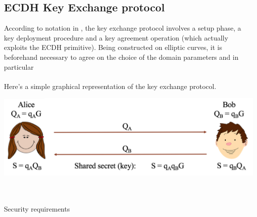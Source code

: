 \subsection{ECDH Key Exchange protocol}
According to notation in \cite{Sec}, the key exchange protocol involves a setup phase, a key deployment procedure and a key agreement operation (which actually exploits the ECDH primitive). 
Being constructed on elliptic curves, it is beforehand necessary to agree on the choice of the domain parameters and in particular
\\ \ \\
Here's a simple graphical representation of the key exchange protocol.
\begin{center}
	\includegraphics[scale = 0.55]{Images/ECDH.png}
	\label{fig:ECDH}
\end{center}
\\ \ \\
Security requirements
